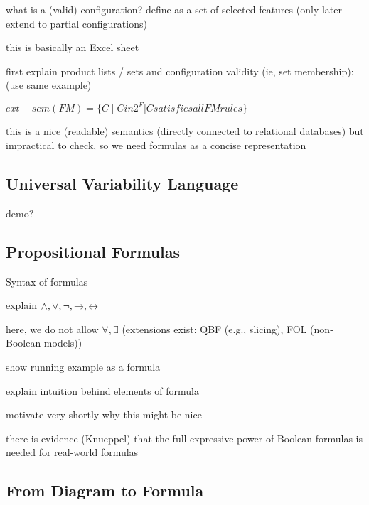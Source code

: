 \begin{frame}{\insertsubsection}
	what is a (valid) configuration? define as a set of selected features (only later extend to partial configurations)

	this is basically an Excel sheet

	first explain product lists / sets and configuration validity (ie, set membership): (use same example)

	$ext-sem (FM) = \{ C \mid C in 2^F | C satisfies all FM rules \}$

	this is a nice (readable) semantics (directly connected to relational databases) but impractical to check, so we need formulas as a concise representation
\end{frame}

\subsection{Universal Variability Language}

\begin{frame}{\insertsubsection}
	demo?
\end{frame}

\subsection{Propositional Formulas}

\begin{frame}{\insertsubsection}
	Syntax of formulas

	explain $\wedge, \vee, \neg, \rightarrow, \leftrightarrow$

	here, we do not allow $\forall, \exists$ (extensions exist: QBF (e.g., slicing), FOL (non-Boolean models))
\end{frame}

\begin{frame}{\insertsubsection}
	show running example as a formula
	
	explain intuition behind elements of formula

	motivate very shortly why this might be nice

	there is evidence (Knueppel) that the full expressive power of Boolean formulas is needed for real-world formulas
\end{frame}

\subsection{From Diagram to Formula}

